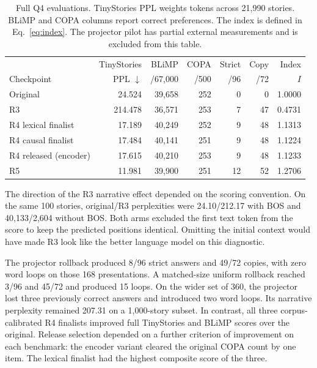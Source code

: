 \documentclass[11pt]{article}
\begin{document}
\begin{table}[tbp]\centering\small
\caption{Full Q4 evaluations. TinyStories PPL weights tokens across 21,990 stories. BLiMP and COPA columns report correct preferences. The index is defined in Eq.~\ref{eq:index}. The projector pilot has partial external measurements and is excluded from this table.}\label{tab:external}
\begin{tabular}{@{}lrrrrrr@{}}\toprule
 & TinyStories & BLiMP & COPA & Strict & Copy & Index\\[-2pt]
Checkpoint & PPL $\downarrow$ & /67,000 & /500 & /96 & /72 & $I$\\\midrule
Original                 & 24.524  & 39,658 & 252 & 0 & 0 & 1.0000\\
R3                       & 214.478 & 36,571 & 253 & 7 & 47 & 0.4731\\
R4 lexical finalist      & 17.189  & 40,249 & 252 & 9 & 48 & 1.1313\\
R4 causal finalist       & 17.484  & 40,141 & 251 & 9 & 48 & 1.1224\\
R4 released (encoder)    & 17.615  & 40,210 & 253 & 9 & 48 & 1.1233\\
R5                       & 11.981  & 39,900 & 251 & 12 & 52 & 1.2706\\\bottomrule
\end{tabular}
\end{table}

The direction of the R3 narrative effect depended on the scoring convention. On the same 100 stories, original/R3 perplexities were 24.10/212.17 with BOS and 40,133/2,604 without BOS. Both arms excluded the first text token from the score to keep the predicted positions identical. Omitting the initial context would have made R3 look like the better language model on this diagnostic.

The projector rollback produced 8/96 strict answers and 49/72 copies, with zero word loops on those 168 presentations. A matched-size uniform rollback reached 3/96 and 45/72 and produced 15 loops. On the wider set of 360, the projector lost three previously correct answers and introduced two word loops. Its narrative perplexity remained 207.31 on a 1,000-story subset. In contrast, all three corpus-calibrated R4 finalists improved full TinyStories and BLiMP scores over the original. Release selection depended on a further criterion of improvement on each benchmark: the encoder variant cleared the original COPA count by one item. The lexical finalist had the highest composite score of the three.
\end{document}
